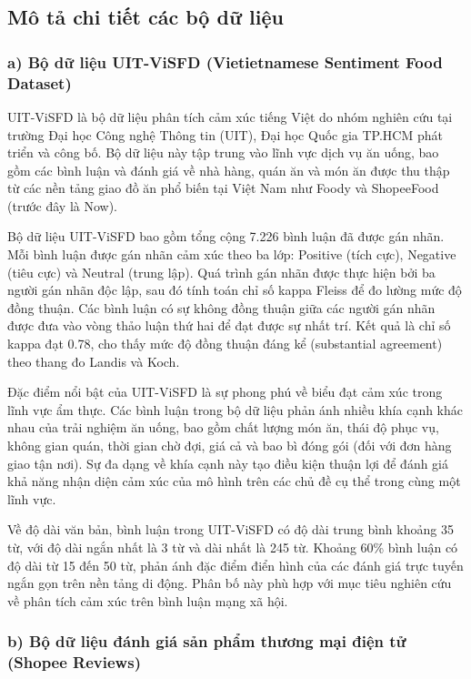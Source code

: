 \documentclass[14pt, a4paper]{report}
\begin{document}
\subsection{Mô tả chi tiết các bộ dữ liệu}


\subsubsection{a) Bộ dữ liệu UIT-ViSFD (Vietietnamese Sentiment Food Dataset)}


UIT-ViSFD là bộ dữ liệu phân tích cảm xúc tiếng Việt do nhóm nghiên cứu tại trường Đại học Công nghệ Thông tin (UIT), Đại học Quốc gia TP.HCM phát triển và công bố. Bộ dữ liệu này tập trung vào lĩnh vực dịch vụ ăn uống, bao gồm các bình luận và đánh giá về nhà hàng, quán ăn và món ăn được thu thập từ các nền tảng giao đồ ăn phổ biến tại Việt Nam như Foody và ShopeeFood (trước đây là Now).


Bộ dữ liệu UIT-ViSFD bao gồm tổng cộng 7.226 bình luận đã được gán nhãn. Mỗi bình luận được gán nhãn cảm xúc theo ba lớp: Positive (tích cực), Negative (tiêu cực) và Neutral (trung lập). Quá trình gán nhãn được thực hiện bởi ba người gán nhãn độc lập, sau đó tính toán chỉ số kappa Fleiss để đo lường mức độ đồng thuận. Các bình luận có sự không đồng thuận giữa các người gán nhãn được đưa vào vòng thảo luận thứ hai để đạt được sự nhất trí. Kết quả là chỉ số kappa đạt 0.78, cho thấy mức độ đồng thuận đáng kể (substantial agreement) theo thang đo Landis và Koch.


Đặc điểm nổi bật của UIT-ViSFD là sự phong phú về biểu đạt cảm xúc trong lĩnh vực ẩm thực. Các bình luận trong bộ dữ liệu phản ánh nhiều khía cạnh khác nhau của trải nghiệm ăn uống, bao gồm chất lượng món ăn, thái độ phục vụ, không gian quán, thời gian chờ đợi, giá cả và bao bì đóng gói (đối với đơn hàng giao tận nơi). Sự đa dạng về khía cạnh này tạo điều kiện thuận lợi để đánh giá khả năng nhận diện cảm xúc của mô hình trên các chủ đề cụ thể trong cùng một lĩnh vực.


Về độ dài văn bản, bình luận trong UIT-ViSFD có độ dài trung bình khoảng 35 từ, với độ dài ngắn nhất là 3 từ và dài nhất là 245 từ. Khoảng 60\% bình luận có độ dài từ 15 đến 50 từ, phản ánh đặc điểm điển hình của các đánh giá trực tuyến ngắn gọn trên nền tảng di động. Phân bố này phù hợp với mục tiêu nghiên cứu về phân tích cảm xúc trên bình luận mạng xã hội.


\subsubsection{b) Bộ dữ liệu đánh giá sản phẩm thương mại điện tử (Shopee Reviews)}
\end{document}
